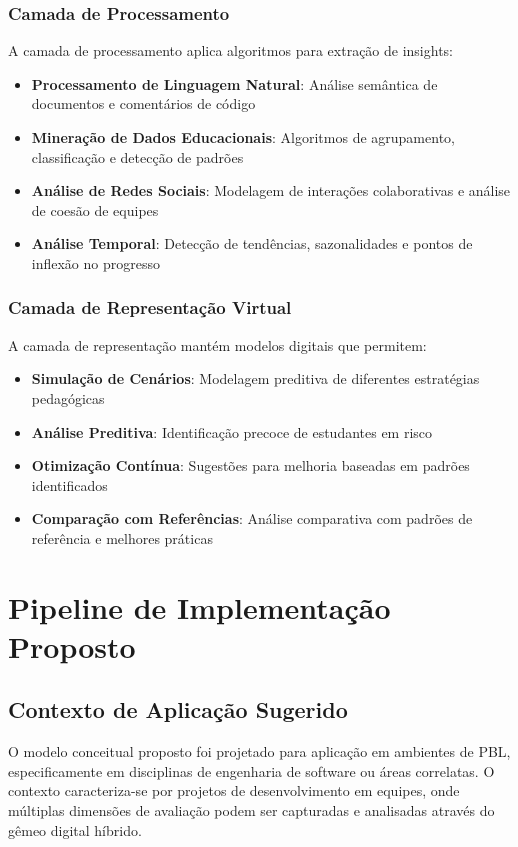 \documentclass[english, spanish, brazilian]{modelo_dt}
\begin{document}
\subsubsection{Camada de Processamento}

A camada de processamento aplica algoritmos para extração de insights:
\begin{itemize}
  \item \textbf{Processamento de Linguagem Natural}: Análise semântica de documentos e comentários de código
  \item \textbf{Mineração de Dados Educacionais}: Algoritmos de agrupamento, classificação e detecção de padrões
  \item \textbf{Análise de Redes Sociais}: Modelagem de interações colaborativas e análise de coesão de equipes
  \item \textbf{Análise Temporal}: Detecção de tendências, sazonalidades e pontos de inflexão no progresso
\end{itemize}

\subsubsection{Camada de Representação Virtual}

A camada de representação mantém modelos digitais que permitem:
\begin{itemize}
  \item \textbf{Simulação de Cenários}: Modelagem preditiva de diferentes estratégias pedagógicas
  \item \textbf{Análise Preditiva}: Identificação precoce de estudantes em risco
  \item \textbf{Otimização Contínua}: Sugestões para melhoria baseadas em padrões identificados
  \item \textbf{Comparação com Referências}: Análise comparativa com padrões de referência e melhores práticas
\end{itemize}

\section{Pipeline de Implementação Proposto}

\subsection{Contexto de Aplicação Sugerido}

O modelo conceitual proposto foi projetado para aplicação em ambientes de PBL,
especificamente em disciplinas de engenharia de software ou áreas correlatas. O
contexto caracteriza-se por projetos de desenvolvimento em equipes, onde
múltiplas dimensões de avaliação podem ser capturadas e analisadas através do
gêmeo digital híbrido.
\end{document}
